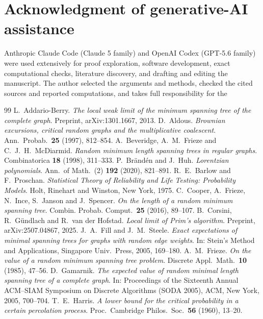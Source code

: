 \documentclass[10pt,a4paper]{amsart}
\begin{document}
\section*{Acknowledgment of generative-AI assistance}
Anthropic Claude Code (Claude 5 family) and OpenAI Codex (GPT-5.6 family) were
used extensively for proof exploration, software development, exact
computational checks, literature discovery, and drafting and editing the
manuscript. The author selected the arguments and methods, checked the cited
sources and reported computations, and takes full responsibility for the

\begin{thebibliography}{99}
 L.~Addario-Berry. \emph{The local weak limit of the minimum spanning tree of the complete graph}. Preprint, arXiv:1301.1667, 2013.
 D.~Aldous. \emph{Brownian excursions, critical random graphs and the multiplicative coalescent}. Ann.\ Probab.\ \textbf{25} (1997), 812--854.
 A.~Beveridge, A.~M.~Frieze and C.~J.~H.~McDiarmid. \emph{Random minimum length spanning trees in regular graphs}. Combinatorica \textbf{18} (1998), 311--333.
 P.~Br\"and\'en and J.~Huh. \emph{Lorentzian polynomials}. Ann.\ of Math.\ (2) \textbf{192} (2020), 821--891.
 R.~E.~Barlow and F.~Proschan. \emph{Statistical Theory of Reliability and Life Testing: Probability Models}. Holt, Rinehart and Winston, New York, 1975.
 C.~Cooper, A.~Frieze, N.~Ince, S.~Janson and J.~Spencer. \emph{On the length of a random minimum spanning tree}. Combin. Probab. Comput.\ \textbf{25} (2016), 89--107.
 B.~Corsini, R.~G\"undlach and R.~van der Hofstad. \emph{Local limit of Prim's algorithm}. Preprint, arXiv:2507.04867, 2025.
 J.~A.~Fill and J.~M.~Steele. \emph{Exact expectations of minimal spanning trees for graphs with random edge weights}. In: Stein's Method and Applications, Singapore Univ.\ Press, 2005, 169--180.
 A.~M.~Frieze. \emph{On the value of a random minimum spanning tree problem}. Discrete Appl.\ Math.\ \textbf{10} (1985), 47--56.
 D.~Gamarnik. \emph{The expected value of random minimal length spanning tree of a complete graph}. In: Proceedings of the Sixteenth Annual ACM--SIAM Symposium on Discrete Algorithms (SODA 2005), ACM, New York, 2005, 700--704.
 T.~E.~Harris. \emph{A lower bound for the critical probability in a certain percolation process}. Proc.\ Cambridge Philos.\ Soc.\ \textbf{56} (1960), 13--20.

\end{thebibliography}
\end{document}
